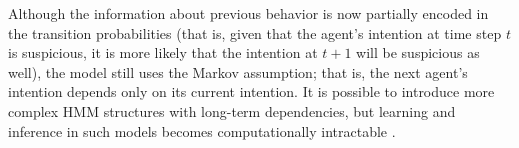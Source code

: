 Although the information about previous behavior is now partially encoded in the transition probabilities (that is, given that the agent's intention at time step $t$ is suspicious, it is more likely that the intention at $t+1$ will be suspicious as well), the model still uses the Markov assumption; that is, the next agent's intention depends only on its current intention. It is possible to introduce more complex HMM structures with long-term dependencies, but learning and inference in such models becomes computationally intractable \citep{KollerFriedman2009}.







